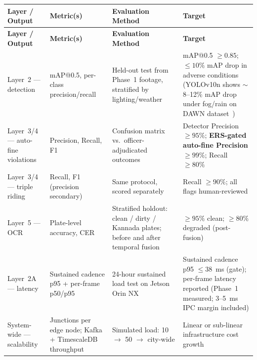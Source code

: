\documentclass[11pt,a4paper]{article}
\begin{document}
\begin{longtable}{L{3.5cm} L{3cm} L{4.5cm} L{3.5cm}}
    \toprule
    \color{white}\textbf{Layer / Output} & \color{white}\textbf{Metric(s)} & \color{white}\textbf{Evaluation Method} & \color{white}\textbf{Target} \\
    \midrule
    \endfirsthead
    \toprule
    \color{white}\textbf{Layer / Output} & \color{white}\textbf{Metric(s)} & \color{white}\textbf{Evaluation Method} & \color{white}\textbf{Target} \\
    \midrule
    \endhead
    \bottomrule
    \endfoot

    Layer~2 — detection & mAP@0.5, per-class precision/recall & Held-out test from Phase~1 footage, stratified by lighting/weather & mAP@0.5 $\geq 0.85$; $\leq 10\%$ mAP drop in adverse conditions (YOLOv10n shows $\sim$8--12\% mAP drop under fog/rain on DAWN dataset~\cite{adverseweather2025}) \\
    Layer~3/4 — auto-fine violations & Precision, Recall, F1 & Confusion matrix vs.\ officer-adjudicated outcomes & Detector Precision $\geq 95\%$; \textbf{ERS-gated auto-fine Precision $\geq 99\%$}; Recall $\geq 80\%$ \\
    Layer~3/4 — triple riding & Recall, F1 (precision secondary) & Same protocol, scored separately & Recall $\geq 90\%$; all flags human-reviewed \\
    Layer~5 — OCR & Plate-level accuracy, CER & Stratified holdout: clean / dirty / Kannada plates; before and after temporal fusion & $\geq 95\%$ clean; $\geq 80\%$ degraded (post-fusion) \\
    Layer~2A — latency & Sustained cadence p95 + per-frame p50/p95 & 24-hour sustained load test on Jetson Orin NX & Sustained cadence p95 $\leq 38$~ms (gate); per-frame latency reported (Phase~1 measured; 3–5~ms IPC margin included) \\
    System-wide — scalability & Junctions per edge node; Kafka + TimescaleDB throughput & Simulated load: 10 $\rightarrow$ 50 $\rightarrow$ city-wide & Linear or sub-linear infrastructure cost growth \\
\end{longtable}
\end{document}
